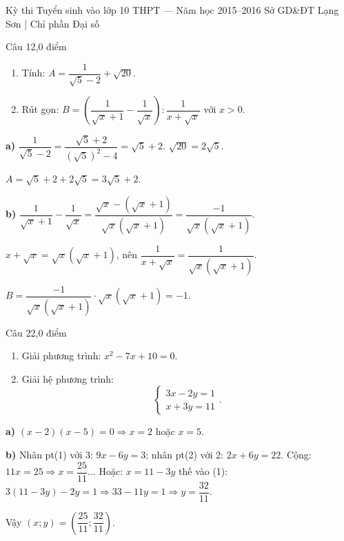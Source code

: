 ﻿%
%
  {Kỳ thi Tuyển sinh vào lớp 10 THPT — Năm học 2015--2016}%
  {Sở GD\&ĐT Lạng Sơn | Chỉ phần Đại số}

\begin{de_cau}{Câu 1}{2,0 điểm}
\begin{enumerate}[label=\alph*)]
  \item Tính: $A = \dfrac{1}{\sqrt{5}-2}+\sqrt{20}$.
  \item Rút gọn: $B = \left(\dfrac{1}{\sqrt{x}+1}-\dfrac{1}{\sqrt{x}}\right):\dfrac{1}{x+\sqrt{x}}$ với $x>0$.
\end{enumerate}
\end{de_cau}

\begin{loi_giai_cau}
\textbf{a)} $\dfrac{1}{\sqrt{5}-2}=\dfrac{\sqrt{5}+2}{(\sqrt{5})^2-4}=\sqrt{5}+2$. $\sqrt{20}=2\sqrt{5}$.

$A=\sqrt{5}+2+2\sqrt{5}=\boxed{3\sqrt{5}+2}$.

\textbf{b)} $\dfrac{1}{\sqrt{x}+1}-\dfrac{1}{\sqrt{x}}=\dfrac{\sqrt{x}-(\sqrt{x}+1)}{\sqrt{x}(\sqrt{x}+1)}=\dfrac{-1}{\sqrt{x}(\sqrt{x}+1)}$.

$x+\sqrt{x}=\sqrt{x}(\sqrt{x}+1)$, nên $\dfrac{1}{x+\sqrt{x}}=\dfrac{1}{\sqrt{x}(\sqrt{x}+1)}$.

$B=\dfrac{-1}{\sqrt{x}(\sqrt{x}+1)}\cdot\sqrt{x}(\sqrt{x}+1)=\boxed{-1}$.
\end{loi_giai_cau}

\begin{de_cau}{Câu 2}{2,0 điểm}
\begin{enumerate}[label=\alph*)]
  \item Giải phương trình: $x^2-7x+10=0$.
  \item Giải hệ phương trình:
  \[\begin{cases} 3x-2y=1 \\ x+3y=11 \end{cases}.\]
\end{enumerate}
\end{de_cau}

\begin{loi_giai_cau}
\textbf{a)} $(x-2)(x-5)=0\Rightarrow\boxed{x=2}$ hoặc $\boxed{x=5}$.

\textbf{b)} Nhân pt(1) với 3: $9x-6y=3$; nhân pt(2) với 2: $2x+6y=22$. Cộng: $11x=25\Rightarrow x=\dfrac{25}{11}$... Hoặc: $x=11-3y$ thế vào (1): $3(11-3y)-2y=1\Rightarrow33-11y=1\Rightarrow y=\dfrac{32}{11}$.

Vậy $(x;y)=\boxed{\left(\dfrac{25}{11};\dfrac{32}{11}\right)}$.
\end{loi_giai_cau}

